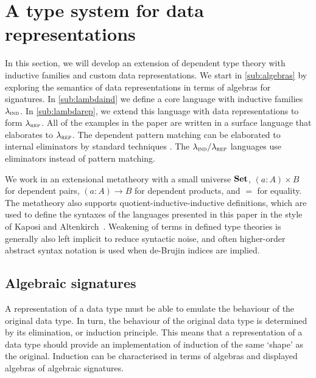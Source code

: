 \section{A type system for data representations}\label{sec:type-system}


In this section, we will develop an extension of dependent type theory with
inductive families and custom data representations. We start in
\cref{sub:algebras} by exploring the semantics of data representations in terms
of algebras for signatures. In \cref{sub:lambdaind}
we define a core language with inductive families $\lambda_{\textsc{ind}}$. In
\cref{sub:lambdarep}, we extend this language with data representations to form
$\lambda_{\textsc{rep}}$. All of the examples in the paper are written in a surface language
that elaborates to $\lambda_{\textsc{rep}}$. The dependent pattern matching can be
elaborated to internal eliminators by standard techniques
\cite{Goguen2006-sy,Cockx2018-fk}. The $\lambda_{\textsc{ind}}/\lambda_{\textsc{rep}}$ languages use eliminators instead
of pattern matching.

We work in an extensional metatheory with a small universe $\mathbf{Set}$, $(a : A)
\times B$ for dependent pairs, $(a : A) \to B$ for dependent products, and $=$
for equality. The metatheory also supports quotient-inductive-inductive
definitions, which are used to define the syntaxes of the languages presented in
this paper in the style of Kaposi and Altenkirch~\cite{Altenkirch2016-zc}.
Weakening of terms in defined type theories is generally also left implicit to
reduce syntactic noise, and often higher-order abstract syntax notation is used
when de-Brujin indices are implied.

\newcommand{\ValidCase}{\mta{ValidCase}}

\subsection{Algebraic signatures}

A representation of a data type must be able to emulate the behaviour of the
original data type. In turn, the behaviour of the original data type is
determined by its elimination, or induction principle. This means that a
representation of a data type should provide an implementation of induction of
the same `shape' as the original. Induction can be characterised in terms of
algebras and displayed algebras of algebraic signatures.

